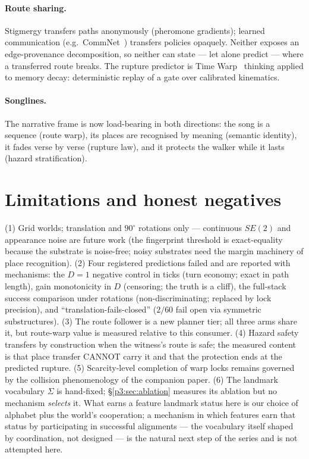 \documentclass{article}
\begin{document}
\paragraph{Route sharing.} Stigmergy transfers paths anonymously
(pheromone gradients); learned communication (e.g.\
CommNet~\cite{sukhbaatar2016commnet}) transfers policies opaquely.
Neither exposes an edge-provenance decomposition, so neither can
state --- let alone predict --- where a transferred route breaks.
The rupture predictor is Time Warp~\cite{jefferson1985} thinking
applied to memory decay: deterministic replay of a gate over
calibrated kinematics.
\paragraph{Songlines.} The narrative frame is now load-bearing in
both directions: the song is a sequence (route warp), its places are
recognised by meaning (semantic identity), it fades verse by verse
(rupture law), and it protects the walker while it lasts (hazard
stratification). %

\section{Limitations and honest negatives}
\label{p3:sec:limits}

(1) Grid worlds; translation and $90^\circ$ rotations only ---
continuous $SE(2)$ and appearance noise are future work (the
fingerprint threshold is exact-equality because the substrate is
noise-free; noisy substrates need the margin machinery of place
recognition). (2) Four registered predictions failed and are reported
with mechanisms: the $D{=}1$ negative control in ticks (turn economy;
exact in path length), gain monotonicity in $D$ (censoring; the truth
is a cliff), the full-stack success comparison under rotations
(non-discriminating; replaced by lock precision), and
``translation-fails-closed'' ($2/60$ fail open via symmetric
substructures). (3) The route follower is a new planner tier; all
three arms share it, but route-warp value is measured relative to
this consumer. (4) Hazard safety transfers by construction when the
witness's route is safe; the measured content is that place transfer
CANNOT carry it and that the protection ends at the predicted
rupture. (5) Scarcity-level completion of warp locks remains governed
by the collision phenomenology of the companion paper. (6) The
landmark vocabulary $\Sigma$ is hand-fixed; \S\ref{p3:sec:ablation}
measures its ablation but no mechanism \emph{selects} it. What earns a
feature landmark status here is our choice of alphabet plus the
world's cooperation; a mechanism in which features earn that status by
participating in successful alignments --- the vocabulary itself
shaped by coordination, not designed --- is the natural next step of
the series and is not attempted here.
\end{document}
